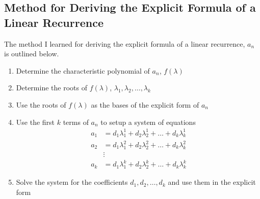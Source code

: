 \documentclass[11pt]{article}
\begin{document}
\subsection{Method for Deriving the Explicit Formula of a Linear Recurrence}
The method I learned for deriving the explicit formula of a linear recurrence, $a_n$ is outlined below.
\begin{enumerate}
    \item Determine the characteristic polynomial of $a_n$, $f(\lambda)$
    \item Determine the roots of $f(\lambda)$, $\lambda_1,\lambda_2,\dots,\lambda_k$
    \item Use the roots of $f(\lambda)$ as the bases of the explicit form of $a_n$
    \item Use the first $k$ terms of $a_n$ to setup a system of equations
    \begin{align*}
        a_1 &= d_1\lambda_1^1+d_2\lambda_2^1+\dots+d_k\lambda_k^1 \\
        a_2 &= d_1\lambda_1^2+d_2\lambda_2^2+\dots+d_k\lambda_k^2 \\
        &\vdots \\ 
        a_k &= d_1\lambda_1^k+d_2\lambda_2^k+\dots+d_k\lambda_k^k
    \end{align*}

    \item Solve the system for the coefficients $d_1,d_2,\dots,d_k$ and use them in the explicit form
\end{enumerate}
\end{document}
